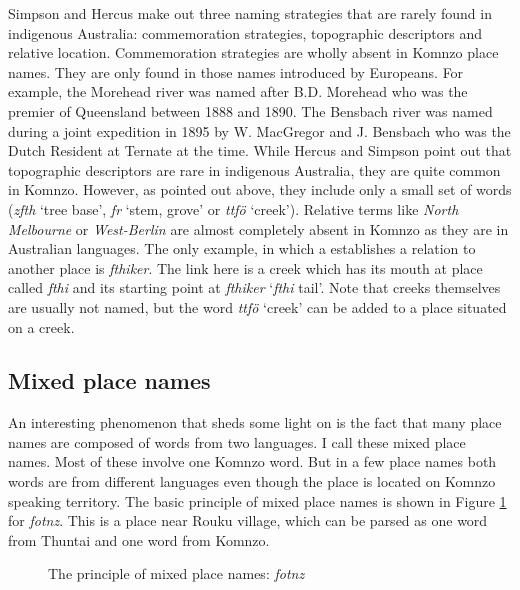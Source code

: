 Simpson and Hercus make out three naming strategies that are rarely found in indigenous Australia: commemoration strategies, topographic descriptors and relative location. Commemoration strategies are wholly absent in Komnzo place names. They are only found in those names introduced by Europeans. For example, the Morehead river was named after B.D. Morehead who was the premier of Queensland between 1888 and 1890. The Bensbach river was named during a joint expedition in 1895 by W. MacGregor and J. Bensbach who was the Dutch Resident at Ternate at the time. While Hercus and Simpson point out that topographic descriptors are rare in indigenous Australia, they are quite common in Komnzo. However, as pointed out above, they include only a small set of words (\emph{zfth} `tree base', \emph{fr} `stem, grove' or \emph{ttfö} `creek'). Relative terms like \emph{North Melbourne} or \emph{West-Berlin} are almost completely absent in Komnzo as they are in Australian languages. The only example, in which a  establishes a relation to another place is \emph{fthiker}. The link here is a creek which has its mouth at place called \emph{fthi} and its starting point at \emph{fthiker} `\emph{fthi} tail'. Note that creeks themselves are usually not named, but the word \emph{ttfö} `creek' can be added to a place situated on a creek.

\subsection{Mixed place names}\label{mixedplacenames}

An interesting phenomenon that sheds some light on  is the fact that many place names are composed of words from two languages. I call these mixed place names. Most of these involve one Komnzo word. But in a few place names both words are from different languages even though the place is located on Komnzo speaking territory. The basic principle of mixed place names is shown in Figure \ref{duplaplace} for \emph{fotnz}. This is a place near Rouku village, which can be parsed as one word from  Thuntai and one word from Komnzo.

\begin{figure}[H]
\begin{center}%
\end{center}
\caption{The principle of mixed place names: \emph{fotnz}}\label{duplaplace}
\end{figure}%

